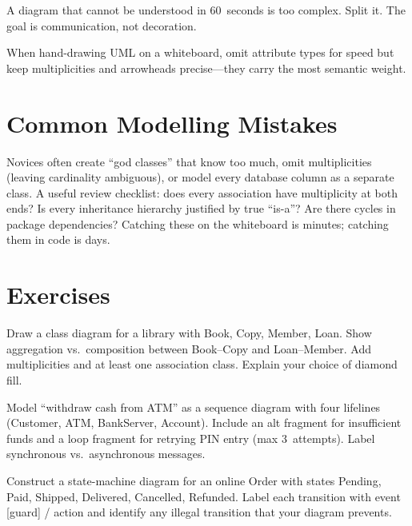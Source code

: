 \begin{remark}
A diagram that cannot be understood in 60~seconds is too complex. Split it. The goal is communication, not decoration.
\end{remark}


\begin{remark}
When hand-drawing UML on a whiteboard, omit attribute types for speed but keep multiplicities and arrowheads precise---they carry the most semantic weight.
\end{remark}


\section{Common Modelling Mistakes}

Novices often create ``god classes'' that know too much, omit multiplicities (leaving cardinality ambiguous), or model every database column as a separate class. A useful review checklist: does every association have multiplicity at both ends? Is every inheritance hierarchy justified by true ``is-a''? Are there cycles in package dependencies? Catching these on the whiteboard is minutes; catching them in code is days.

\section{Exercises}

\begin{exercise}
Draw a class diagram for a library with Book, Copy, Member, Loan. Show aggregation vs.\ composition between Book--Copy and Loan--Member. Add multiplicities and at least one association class. Explain your choice of diamond fill.
\end{exercise}

\begin{exercise}
Model ``withdraw cash from ATM'' as a sequence diagram with four lifelines (Customer, ATM, BankServer, Account). Include an alt fragment for insufficient funds and a loop fragment for retrying PIN entry (max 3~attempts). Label synchronous vs.\ asynchronous messages.
\end{exercise}

\begin{exercise}
Construct a state-machine diagram for an online Order with states Pending, Paid, Shipped, Delivered, Cancelled, Refunded. Label each transition with event [guard] / action and identify any illegal transition that your diagram prevents.
\end{exercise}

